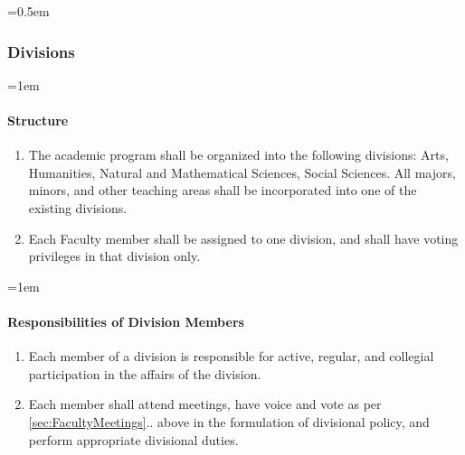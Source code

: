 \documentclass{manual}
\let\oldsubsubsection\subsubsection
\renewcommand\subsubsection{\leftskip=0.5em\oldsubsubsection}
\let\oldparagraph\paragraph
\renewcommand\paragraph{\leftskip=1em\oldparagraph}
\newcommand{\itemLevelA}{\alph*.}
\newcommand{\itemRefA}{\alph*}
\begin{document}
\subsubsection{Divisions}\label{sub:Divisions}
\paragraph{Structure}
\begin{enumerate}[label=\itemLevelA,ref=\itemRefA]
\item The academic program shall be organized into the following divisions: Arts, Humanities, Natural and Mathematical Sciences, Social Sciences. All majors, minors, and other teaching areas shall be incorporated into one of the existing divisions.
\item Each Faculty member shall be assigned to one division, and shall have voting privileges in that division only.
\end{enumerate}

\paragraph{Responsibilities of Division Members}
\begin{enumerate}[label=\itemLevelA,ref=\itemRefA]
\item Each member of a division is responsible for active, regular, and collegial participation in the affairs of the division.
\item Each member shall attend meetings, have voice and vote as per \cref{sec:FacultyMeetings}.. above in the formulation of divisional policy, and perform appropriate divisional duties.
\end{enumerate}

\end{document}

